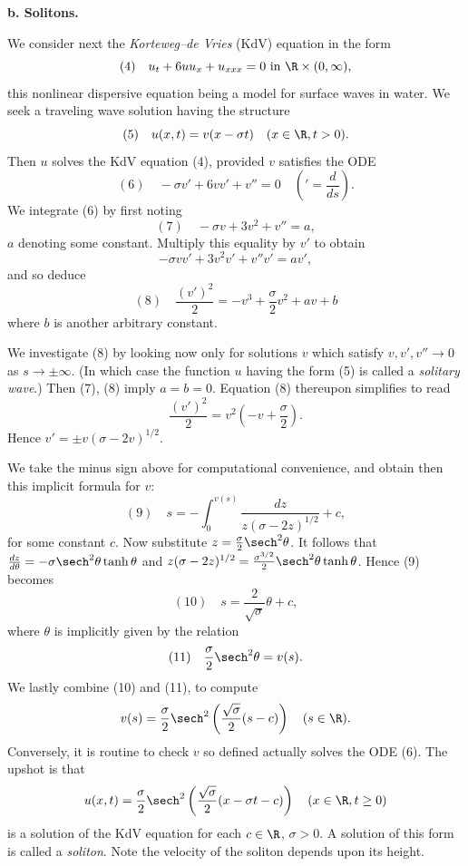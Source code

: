 \textbf{b. Solitons.}

\begin{example}
\label{ex:kdv-soliton-traveling-wave}
We consider next the \textit{Korteweg--de Vries} (KdV) equation in the form
$$(4) \quad u_t + 6uu_x + u_{xxx} = 0 \text{ in } \R \times (0,\infty),$$
this nonlinear dispersive equation being a model for surface waves in water. We seek a traveling wave solution having the structure
$$(5) \quad u(x,t) = v(x - \sigma t) \quad (x \in \R, t > 0).$$
Then $u$ solves the KdV equation (4), provided $v$ satisfies the ODE
$$(6) \quad -\sigma v' + 6vv' + v'' = 0 \quad \left(' = \frac{d}{ds}\right).$$
We integrate (6) by first noting
$$(7) \quad -\sigma v + 3v^2 + v'' = a,$$
$a$ denoting some constant. Multiply this equality by $v'$ to obtain
$$-\sigma v v' + 3v^2 v' + v'' v' = av',$$
and so deduce
$$(8) \quad \frac{(v')^2}{2} = -v^3 + \frac{\sigma}{2} v^2 + av + b$$
where $b$ is another arbitrary constant.

We investigate (8) by looking now only for solutions $v$ which satisfy $v, v', v'' \to 0$ as $s \to \pm\infty$. (In which case the function $u$ having the form (5) is called a \textit{solitary wave}.) Then (7), (8) imply $a = b = 0$. Equation (8) thereupon simplifies to read
$$\frac{(v')^2}{2} = v^2 \left(-v + \frac{\sigma}{2}\right).$$
Hence $v' = \pm v(\sigma - 2v)^{1/2}$.

We take the minus sign above for computational convenience, and obtain then this implicit formula for $v$:
$$(9) \quad s = -\int_0^{v(s)} \frac{dz}{z(\sigma - 2z)^{1/2}} + c,$$
for some constant $c$. Now substitute $z = \frac{\sigma}{2} \sech^2 \theta$. It follows that $\frac{dz}{d\theta} = -\sigma \sech^2 \theta \tanh \theta$ and $z(\sigma - 2z)^{1/2} = \frac{\sigma^{3/2}}{2} \sech^2 \theta \tanh \theta$. Hence (9) becomes
$$(10) \quad s = \frac{2}{\sqrt{\sigma}} \theta + c,$$
where $\theta$ is implicitly given by the relation
$$(11) \quad \frac{\sigma}{2} \sech^2 \theta = v(s).$$
We lastly combine (10) and (11), to compute
$$v(s) = \frac{\sigma}{2} \sech^2 \left(\frac{\sqrt{\sigma}}{2}(s-c)\right) \quad (s \in \R).$$
Conversely, it is routine to check $v$ so defined actually solves the ODE (6). The upshot is that
$$u(x,t) = \frac{\sigma}{2} \sech^2 \left(\frac{\sqrt{\sigma}}{2}(x - \sigma t - c)\right) \quad (x \in \R, t \geq 0)$$
is a solution of the KdV equation for each $c \in \R$, $\sigma > 0$. A solution of this form is called a \textit{soliton}. Note the velocity of the soliton depends upon its height.
\end{example}


